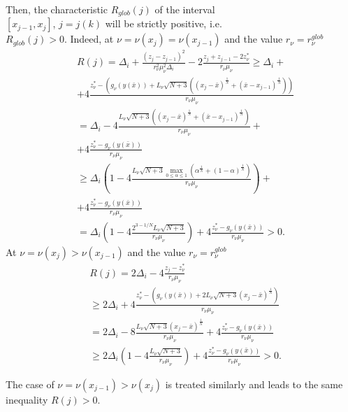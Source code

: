 \documentclass[twocolumn]{svjour3}          %
\begin{document}
	Then, the characteristic $R_{glob}(j)$ of the interval \\
$[x_{j-1}, x_j]$, $j=j(k)$ will be strictly positive, i.e. \\
$R_{glob}(j)>0$. Indeed, at $\nu=\nu(x_j)=\nu(x_{j-1})$ and the value $r_{\nu}=r_{\nu}^{glob}$
\small
\begin{align*}
	& R(j) = \Delta_i + \frac{(z_j-z_{j-1})^2}{r_{\nu}^2\mu_{\nu}^2\Delta_i} - 2\frac{z_j+z_{j-1}-2z_{\nu}^{\ast}}{r_{\nu}\mu_{\nu}} \geq \Delta_i + \\ 
	& + 4\frac{z_{\nu}^*-\left( g_{\nu}\left( y(\bar x) \right)+L_{\nu}\sqrt{N+3}\left( (x_j-\bar x)^{\frac{1}{N}}+(\bar x - x_{j-1})^{\frac{1}{N}} \right)\right)}{r_{\nu}\mu_{\nu}} \\
	& = \Delta_i-4\frac{L_{\nu}\sqrt{N+3}\left( (x_j-\bar x)^{\frac{1}{N}}+(\bar x - x_{j-1})^{\frac{1}{N}} \right)}{r_{\nu}\mu_{\nu}} + \\
	& + 4\frac{z_{\nu}^\ast-g_{\nu}\left( y(\bar x) \right)}{r_{\nu}\mu_{\nu}} \\
	& \geq \Delta_i\left(1-4\frac{L_{\nu}\sqrt{N+3}\max_{0\leq\alpha\leq1} {\left( \alpha^{\frac{1}{N}}+(1-\alpha)^{\frac{1}{N}} \right)}}{r_{\nu}\mu_{\nu}} \right) + \\
	& + 4\frac{z_{\nu}^{\ast}-g_{\nu}\left( y(\bar x) \right)}{r_{\nu}\mu_{\nu}} \\
	& = \Delta_i\left(1-4\frac{2^{3-1/N}L_{\nu}\sqrt{N+3}}{r_{\nu}\mu_{\nu}} \right)+4\frac{z_{\nu}^{\ast}-g_{\nu}\left( y(\bar x) \right)}{r_{\nu}\mu_{\nu}} > 0.
\end{align*}
\normalsize
At $\nu=\nu(x_j ) > \nu(x_{j-1})$ and the value $r_{\nu}=r_{\nu}^{glob}$
\begin{align*}
	& R(j) = 2\Delta_i - 4\frac{z_j-z_{\nu}^{\ast}}{r_{\nu}\mu_{\nu}} \\
	& \geq 2\Delta_i+4\frac{z_{\nu}^{\ast}-\left( g_{\nu}\left(y(\bar x)\right)+2L_{\nu}\sqrt{N+3}(x_j-\bar x)^{\frac{1}{N}} \right)}{r_{\nu}\mu_{\nu}} \\
	& = 2\Delta_i - 8\frac{L_{\nu}\sqrt{N+3}(x_j-\bar x)^{\frac{1}{N}}}{r_{\nu}\mu_{\nu}}+4\frac{z_{\nu}^{\ast}-g_{\nu}\left( y(\bar x) \right)}{r_{\nu}\mu_{\nu}} \\
	& \geq 2\Delta_i\left( 1-4\frac{L_{\nu}\sqrt{N+3}}{r_{\nu}\mu_{\nu}} \right) + 4\frac{z_{\nu}^{\ast}-g_{\nu}\left( y(\bar x) \right)}{r_{\nu}\mu_{\nu}} > 0.
\end{align*}

	The case of $\nu=\nu(x_{j-1})>\nu(x_j)$ is treated similarly and leads to the same inequality $R(j)>0$.
\end{document}
